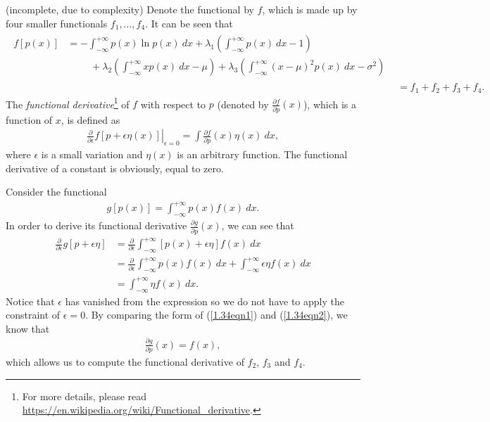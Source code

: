 \begin{answer}{(incomplete, due to complexity)}
	Denote the functional by $f$, which is made up by four smaller functionals $f_1, \ldots, f_4$. It can be seen that
	\begin{align}
		\begin{split}\label{1.34eqn0}
			f[p(x)] &= - \int_{-\infty}^{+\infty} p(x) \ln p(x)\ dx + \lambda_1 \left( \int_{-\infty}^{+\infty} p(x)\ dx - 1 \right)\\
			&\phantom{=}\quad + \lambda_2\left( \int_{-\infty}^{+\infty} xp(x)\ dx - \mu \right) + \lambda_3\left( \int_{-\infty}^{+\infty} (x-\mu)^2p(x)\ dx - \sigma^2 \right)
		\end{split}\\
		&= f_1 + f_2 + f_3 + f_4.
	\end{align}
	The \emph{functional derivative}\footnote{For more details, please read \url{https://en.wikipedia.org/wiki/Functional_derivative}.} of $f$ with respect to $p$ (denoted by $\frac{\partial f}{\partial p}(x)$), which is a function of $x$, is defined as
	\begin{align}\label{1.34eqn1}
		\left.\frac{\partial}{\partial \epsilon}f[p + \epsilon \eta(x)]\right\rvert_{\epsilon = 0} = \int \frac{\partial f}{\partial p}(x) \eta(x)\ dx,
	\end{align}
	where $\epsilon$ is a small variation and $\eta(x)$ is an arbitrary function. The functional derivative of a constant is obviously, equal to zero.
	
	Consider the functional
	\begin{align}
		g[p(x)] = \int_{-\infty}^{+\infty} p(x) f(x)\ dx.
	\end{align}
	In order to derive its functional derivative $\frac{\partial g}{\partial p}(x)$, we can see that
	\begin{align}
		\frac{\partial}{\partial \epsilon}g[p + \epsilon \eta] &= \frac{\partial}{\partial \epsilon} \int_{-\infty}^{+\infty} [p(x) + \epsilon\eta] f(x)\ dx\\
		&= \frac{\partial}{\partial \epsilon} \int_{-\infty}^{+\infty} p(x)f(x)\ dx + \int_{-\infty}^{+\infty} \epsilon\eta f(x)\ dx\\
		&= \int_{-\infty}^{+\infty} \eta f(x)\ dx.\label{1.34eqn2}
	\end{align}
	Notice that $\epsilon$ has vanished from the expression so we do not have to apply the constraint of $\epsilon = 0$. By comparing the form of (\ref{1.34eqn1}) and (\ref{1.34eqn2}), we know that
	\begin{align}
		\frac{\partial g}{\partial p}(x) = f(x),
	\end{align}
	which allows us to compute the functional derivative of $f_2$, $f_3$ and $f_4$.


\end{answer}
